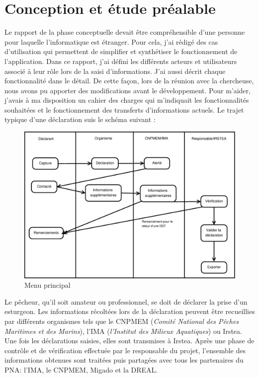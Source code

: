 \documentclass[12pt,a4paper,titlepage,twoside]{report}
\begin{document}
\section{Conception et étude préalable}
Le rapport de la phase conceptuelle devait être compréhensible d'une personne pour laquelle l'informatique est étranger. Pour cela, j'ai rédigé des cas d'utilisation qui permettent de simplifier et synthétiser le fonctionnement de l'application. Dans ce rapport, j'ai défini les différents acteurs et utilisateurs associé à leur rôle lors de la saisi d'informations. J'ai aussi décrit chaque fonctionnalité dans le détail. De cette façon, lors de la réunion avec la chercheuse, nous avons pu apporter des modifications avant le développement.
Pour m'aider, j'avais à ma disposition un cahier des charges qui m'indiquait les fonctionnalités souhaitées et le fonctionnement des transferts d'informations actuels.
\clearpage
Le trajet typique d'une déclaration suis le schéma suivant : 

\begin{figure}[h]
\centering
\includegraphics[width=\textwidth]{pictures/schemaDeclaration.eps}
\caption{Menu principal}
\end{figure}

Le pêcheur, qu'il soit amateur ou professionnel, se doit de déclarer la prise d'un esturgeon. Les informations récoltées  lors de la déclaration peuvent être recueillies par différents organismes tels que le CNPMEM (\textit{Comité National des Pêches Maritimes et des  Marins}), l'IMA (\textit{l'Institut des Milieux Aquatiques}) ou Irstea. Une fois les déclarations saisies, elles sont transmises à Irstea. Après une phase de contrôle et de vérification effectuée par le responsable du projet, l'ensemble des informations obtenues sont traitées puis partagées avec tous les partenaires du PNA: l'IMA, le CNPMEM, Migado et la DREAL.
\end{document}
